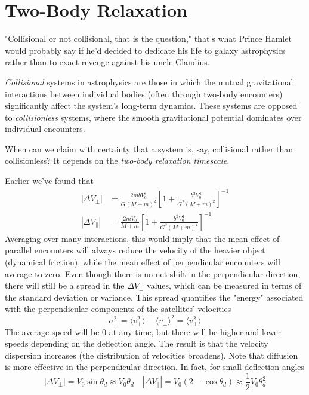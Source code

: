 \section{Two-Body Relaxation}

"Collisional or not collisional, that is the question," that's what Prince Hamlet would probably say if he'd decided to dedicate his life to galaxy astrophysics rather than to exact revenge against his uncle Claudius.
\par \emph{Collisional} systems in astrophysics are those in which the mutual gravitational interactions between individual bodies (often through two-body encounters) significantly affect the system's long-term dynamics. These systems are opposed to \emph{collisionless} systems, where the smooth gravitational potential dominates over individual encounters.
\par When can we claim with certainty that a system is, say, collisional rather than collisionless? It depends on the \emph{two-body relaxation timescale.}
\par Earlier we've found that 
\begin{align*}
    |\Delta V_{\perp}| &= \frac{2mbV_{0}^{3}}{G(M+m)^{2}}\left[1+\frac{b^{2}V_{0}^{4}}{G^{2}(M+m)^{2}}\right]^{-1}\\
    |\Delta V_{\parallel}| &= \frac{2mV_{0}}{M+m}\left[1+\frac{b^{2}V_{0}^{4}}{G^{2}(M+m)^{2}}\right]^{-1}
\end{align*}
Averaging over many interactions, this would imply that the mean effect of parallel encounters will always reduce the velocity of the heavier object (dynamical friction), while the mean effect of perpendicular encounters will average to zero. Even though there is no net shift in the perpendicular direction, there will still be a spread in the $\Delta V_{\perp}$ values, which can be measured in terms of the standard deviation or variance. This spread quantifies the "energy" associated with the perpendicular components of the satellites' velocities
\begin{equation*}
    \sigma_{\perp}^{2} = \langle v_{\perp}^{2}\rangle - \langle v_{\perp}\rangle^{2} = \langle v_{\perp}^{2}\rangle
\end{equation*}
The average speed will be 0 at any time, but there will be higher and lower speeds depending on the deflection angle. The result is that the velocity dispersion increases (the distribution of velocities broadens). Note that diffusion is more effective in the perpendicular direction. In fact, for small deflection angles
\begin{equation*}
    |\Delta V_{\perp}| = V_{0}\sin\theta_{d} \approx V_{0}\theta_{d} \quad |\Delta V_{\parallel}| = V_{0}(2-\cos\theta_{d})\approx \frac{1}{2}V_{0}\theta_{d}^{2}
\end{equation*}
